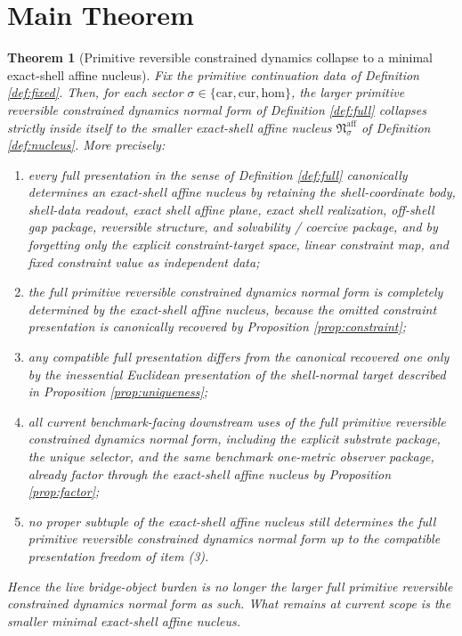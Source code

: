 \documentclass[11pt]{article}
\newcommand{\Car}{\mathrm{car}}
\newcommand{\Cur}{\mathrm{cur}}
\newcommand{\Hom}{\mathrm{hom}}
\newcommand{\AffineNucleus}[1]{\mathfrak N_{#1}^{\mathrm{aff}}}
\newtheorem{theorem}{Theorem}
\begin{document}
\section{Main Theorem}

\begin{theorem}[Primitive reversible constrained dynamics collapse to a minimal exact-shell affine nucleus]
\label{thm:main}
Fix the primitive continuation data of Definition \ref{def:fixed}. Then, for each sector \(\sigma\in\{\Car,\Cur,\Hom\}\), the larger primitive reversible constrained dynamics normal form of Definition \ref{def:full} collapses strictly inside itself to the smaller exact-shell affine nucleus \(\AffineNucleus{\sigma}\) of Definition \ref{def:nucleus}. More precisely:
\begin{enumerate}
    \item every full presentation in the sense of Definition \ref{def:full} canonically determines an exact-shell affine nucleus by retaining the shell-coordinate body, shell-data readout, exact shell affine plane, exact shell realization, off-shell gap package, reversible structure, and solvability / coercive package, and by forgetting only the explicit constraint-target space, linear constraint map, and fixed constraint value as independent data;
    \item the full primitive reversible constrained dynamics normal form is completely determined by the exact-shell affine nucleus, because the omitted constraint presentation is canonically recovered by Proposition \ref{prop:constraint};
    \item any compatible full presentation differs from the canonical recovered one only by the inessential Euclidean presentation of the shell-normal target described in Proposition \ref{prop:uniqueness};
    \item all current benchmark-facing downstream uses of the full primitive reversible constrained dynamics normal form, including the explicit substrate package, the unique selector, and the same benchmark one-metric observer package, already factor through the exact-shell affine nucleus by Proposition \ref{prop:factor};
    \item no proper subtuple of the exact-shell affine nucleus still determines the full primitive reversible constrained dynamics normal form up to the compatible presentation freedom of item (3).
\end{enumerate}
Hence the live bridge-object burden is no longer the larger full primitive reversible constrained dynamics normal form as such. What remains at current scope is the smaller minimal exact-shell affine nucleus.
\end{theorem}
\end{document}
